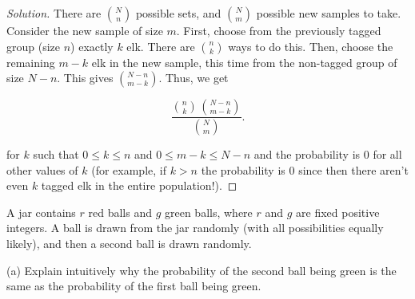 \documentclass[10pt]{article}
\newenvironment{problem}[2][Problem]{\begin{trivlist}
\item[\hskip \labelsep {\bfseries #1}\hskip \labelsep {\bfseries #2.}]}{\end{trivlist}}
\begin{document}
\begin{proof}[Solution]

There are \(\binom{N}{n}\) possible sets, and \(\binom{N}{m}\) possible new samples to take. Consider the new sample of size $m$. First, choose from the previously tagged group (size $n$) exactly $k$ elk. There are \(\binom{n}{k}\) ways to do this. Then, choose the remaining $m - k$ elk in the new sample, this time from the non-tagged group of size $N - n$. This gives \(\binom{N - n}{m - k}\). Thus, we get

\[
\frac{\binom{n}{k} \, \binom{N - n}{m - k}}{\binom{N}{m}}.
\]

for $k$ such that $0 \leq k \leq n$ and $0 \leq m - k \leq N - n$ and the probability is 0 for all
other values of $k$ (for example, if $k > n$ the probability is 0 since then there aren’t
even $k$ tagged elk in the entire population!). 
\end{proof}

\begin{problem}{5} 
A jar contains $r$ red balls and $g$ green balls, where $r$ and $g$ are fixed positive integers. A ball is drawn from the jar randomly (with all possibilities equally likely), and then a second ball is drawn randomly.
\end{problem}

(a) Explain intuitively why the probability of the second ball being green is the same as the probability of the first ball being green.
\end{document}
